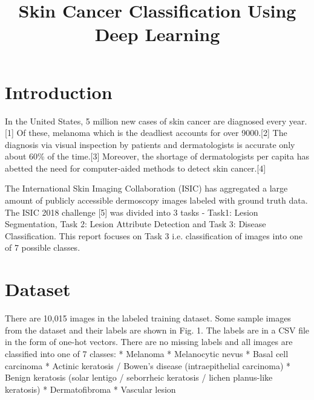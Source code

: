 \documentclass[conference]{IEEEtran}
\begin{document}
\title{Skin Cancer Classification Using Deep Learning\\}
\author{
\and
{}
}

\maketitle

\section{Introduction}\label{introduction}

In the United States, 5 million new cases of skin cancer are diagnosed
every year.{[}1{]} Of these, melanoma which is the deadliest accounts
for over 9000.{[}2{]} The diagnosis via visual inspection by patients
and dermatologists is accurate only about 60\% of the time.{[}3{]}
Moreover, the shortage of dermatologists per capita has abetted the need
for computer-aided methods to detect skin cancer.{[}4{]}

The International Skin Imaging Collaboration (ISIC) has aggregated a
large amount of publicly accessible dermoscopy images labeled with
ground truth data. The ISIC 2018 challenge {[}5{]} was divided into 3
tasks - Task1: Lesion Segmentation, Task 2: Lesion Attribute Detection
and Task 3: Disease Classification. This report focuses on Task 3 i.e.
classification of images into one of 7 possible classes.

    \section{Dataset}\label{dataset}

There are 10,015 images in the labeled training dataset. Some sample
images from the dataset and their labels are shown in Fig. 1. The labels
are in a CSV file in the form of one-hot vectors. There are no missing
labels and all images are classified into one of 7 classes: * Melanoma *
Melanocytic nevus * Basal cell carcinoma * Actinic keratosis / Bowen's
disease (intraepithelial carcinoma) * Benign keratosis (solar lentigo /
seborrheic keratosis / lichen planus-like keratosis) * Dermatofibroma *
Vascular lesion
\end{document}

